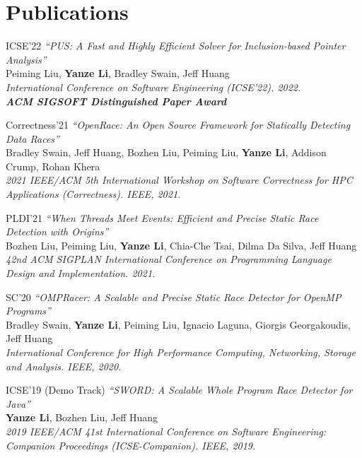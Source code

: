 \documentclass[12pt,letterpaper]{report}
\newcommand{\listtabwidth}{1.75cm}
\begin{document}
\section*{Publications}
\begin{tablist}
	\item[ICSE'22] \tab \textit{\enquote{PUS: A Fast and Highly Efficient Solver for Inclusion-based Pointer Analysis}}\\
	Peiming Liu, \textbf{Yanze Li}, Bradley Swain, Jeff Huang \\
	\textit{International Conference on Software Engineering (ICSE'22). 2022.} \\
	\textit{\textbf{ACM SIGSOFT Distinguished Paper Award}}
	\item[Correctness'21] \tab \textit{\enquote{OpenRace: An Open Source Framework for Statically Detecting Data Races}}\\
	Bradley Swain, Jeff Huang, Bozhen Liu, Peiming Liu, \textbf{Yanze Li}, Addison Crump, Rohan Khera \\
	\textit{2021 IEEE/ACM 5th International Workshop on Software Correctness for HPC Applications (Correctness). IEEE, 2021.}
	\item[PLDI'21] \tab \textit{\enquote{When Threads Meet Events: Efficient and Precise Static Race Detection with Origins}}\\
	Bozhen Liu, Peiming Liu, \textbf{Yanze Li}, Chia-Che Tsai, Dilma Da Silva, Jeff Huang \\
	\textit{42nd ACM SIGPLAN International Conference on Programming Language Design and Implementation. 2021.}
	\item[SC'20] \tab \textit{\enquote{OMPRacer: A Scalable and Precise Static Race Detector for OpenMP Programs}}\\
	Bradley Swain, \textbf{Yanze Li}, Peiming Liu, Ignacio Laguna, Giorgis Georgakoudis, Jeff Huang\\
	\textit{International Conference for High Performance Computing, Networking, Storage and Analysis. IEEE, 2020.}
	\item[ICSE'19] \tab (Demo Track) \textit{\enquote{SWORD: A Scalable Whole Program Race Detector for Java}} \\
	\textbf{Yanze Li}, Bozhen Liu, Jeff Huang\\
	\textit{2019 IEEE/ACM 41st International Conference on Software Engineering: Companion Proceedings (ICSE-Companion). IEEE, 2019.}
\end{tablist}
\renewcommand{\listtabwidth}{1.75cm}
\end{document}
